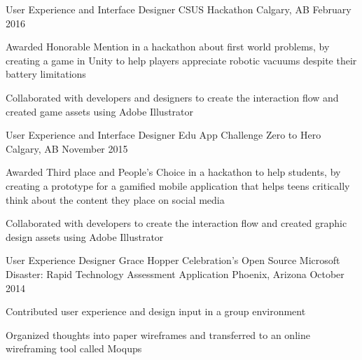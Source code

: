 \begin{cventries}
\cventry
    {User Experience and Interface Designer}
    {CSUS Hackathon}
    {Calgary, AB}
    {February 2016}
    {
      \begin{cvitems}
        \item {Awarded Honorable Mention in a hackathon about first world problems, by creating a game in Unity to help players appreciate robotic vacuums despite their battery limitations}
        \item {Collaborated with developers and designers to create the interaction flow and created game assets using Adobe Illustrator}
      \end{cvitems}
    }
 \cventry
    {User Experience and Interface Designer}
    {Edu App Challenge Zero to Hero}
    {Calgary, AB}
    {November 2015}
    {
      \begin{cvitems}
        \item {Awarded Third place and People's Choice in a hackathon to help students, by creating a prototype for a gamified mobile application that helps teens critically think about the content they place on social media}
        \item {Collaborated with developers to create the interaction flow and created graphic design assets using Adobe Illustrator}
      \end{cvitems}
    }
  \cventry
    {User Experience Designer}
    {Grace Hopper Celebration's Open Source Microsoft Disaster: Rapid Technology Assessment Application}
    {Phoenix, Arizona}
    {October 2014}
    {
      \begin{cvitems}
        \item {Contributed user experience and design input in a group environment}
        \item {Organized thoughts into paper wireframes and transferred to an online wireframing tool called Moqups}
      \end{cvitems}
    }
\end{cventries}
